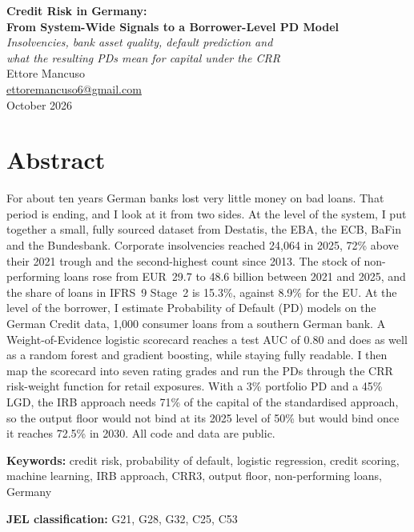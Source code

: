 \documentclass[11pt,a4paper]{article}
\begin{document}
\thispagestyle{empty}
\begin{center}
{\LARGE\bfseries Credit Risk in Germany:\\[4pt] From System-Wide Signals to a Borrower-Level PD Model}\\[10pt]
{\large\itshape Insolvencies, bank asset quality, default prediction and\\ what the resulting PDs mean for capital under the CRR}\\[22pt]
{\large Ettore Mancuso}\\[1pt]
\href{mailto:ettoremancuso6@gmail.com}{ettoremancuso6@gmail.com}\\[1pt]
October 2026
\end{center}
\vspace{16pt}

\section*{Abstract}
For about ten years German banks lost very little money on bad loans. That period is ending, and I look at it from two sides. At the level of the system, I put together a small, fully sourced dataset from Destatis, the EBA, the ECB, BaFin and the Bundesbank. Corporate insolvencies reached 24,064 in 2025, 72\% above their 2021 trough and the second-highest count since 2013. The stock of non-performing loans rose from EUR~29.7 to 48.6 billion between 2021 and 2025, and the share of loans in IFRS~9 Stage~2 is 15.3\%, against 8.9\% for the EU. At the level of the borrower, I estimate Probability of Default (PD) models on the German Credit data, 1,000 consumer loans from a southern German bank. A Weight-of-Evidence logistic scorecard reaches a test AUC of 0.80 and does as well as a random forest and gradient boosting, while staying fully readable. I then map the scorecard into seven rating grades and run the PDs through the CRR risk-weight function for retail exposures. With a 3\% portfolio PD and a 45\% LGD, the IRB approach needs 71\% of the capital of the standardised approach, so the output floor would not bind at its 2025 level of 50\% but would bind once it reaches 72.5\% in 2030. All code and data are public.

\medskip
\textbf{Keywords:} credit risk, probability of default, logistic regression, credit scoring, machine learning, IRB approach, CRR3, output floor, non-performing loans, Germany

\textbf{JEL classification:} G21, G28, G32, C25, C53
\end{document}
